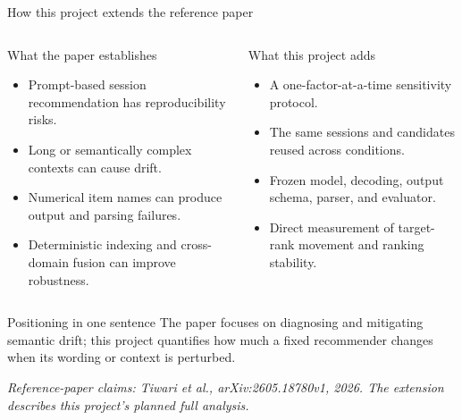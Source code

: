 \documentclass[aspectratio=169,12pt]{beamer}
\newcommand{\source}[1]{\vspace{0.35em}\par{\tiny\color{Muted}\textit{#1}}}
\begin{document}
\begin{frame}{How this project extends the reference paper}
\begin{columns}[T]
\begin{block}{What the paper establishes}
\begin{itemize}
  \item Prompt-based session recommendation has reproducibility risks.
  \item Long or semantically complex contexts can cause drift.
  \item Numerical item names can produce output and parsing failures.
  \item Deterministic indexing and cross-domain fusion can improve robustness.
\end{itemize}
\end{block}

\begin{exampleblock}{What this project adds}
\begin{itemize}
  \item A one-factor-at-a-time sensitivity protocol.
  \item The same sessions and candidates reused across conditions.
  \item Frozen model, decoding, output schema, parser, and evaluator.
  \item Direct measurement of target-rank movement and ranking stability.
\end{itemize}
\end{exampleblock}
\end{columns}

\vspace{0.55em}
\begin{alertblock}{Positioning in one sentence}
The paper focuses on diagnosing and mitigating semantic drift; this project
quantifies how much a fixed recommender changes when its wording or context is
perturbed.
\end{alertblock}

\source{Reference-paper claims: Tiwari et al., arXiv:2605.18780v1, 2026. The extension describes this project's planned full analysis.}
\end{frame}
\end{document}
